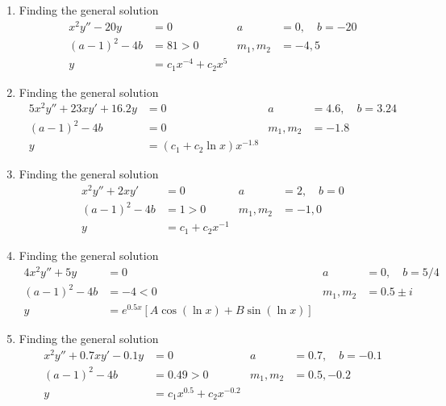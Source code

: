 \begin{enumerate}
    \item Finding the general solution
          \begin{align}
              x^{2}y'' -20y & = 0                        & a            & = 0, \quad b= -20 \\
              (a-1)^{2}-4b  & = 81 > 0                   & m_{1}, m_{2} & = -4, 5           \\
              y             & = c_{1}x^{-4} + c_{2}x^{5}
          \end{align}

    \item Finding the general solution
          \begin{align}
              5x^{2}y'' + 23xy' + 16.2y & = 0                             & a            & = 4.6, \quad b= 3.24 \\
              (a-1)^{2}-4b              & = 0                             & m_{1}, m_{2} & = -1.8               \\
              y                         & = (c_{1} + c_{2}\ln x )x^{-1.8}
          \end{align}

    \item Finding the general solution
          \begin{align}
              x^{2}y'' + 2xy' & = 0                   & a            & = 2, \quad b= 0 \\
              (a-1)^{2}-4b    & = 1 > 0               & m_{1}, m_{2} & = -1, 0         \\
              y               & = c_{1} + c_{2}x^{-1}
          \end{align}

    \item Finding the general solution
          \begin{align}
              4x^{2}y'' + 5y & = 0                                     & a            & = 0, \quad b= 5/4 \\
              (a-1)^{2}-4b   & = -4 < 0                                & m_{1}, m_{2} & = 0.5 \pm i       \\
              y              & = e^{0.5x}[A\cos(\ln x) + B\sin(\ln x)]
          \end{align}

    \item Finding the general solution
          \begin{align}
              x^{2}y'' + 0.7xy' - 0.1y & = 0                            & a            & = 0.7, \quad b= -0.1 \\
              (a-1)^{2}-4b             & = 0.49 > 0                     & m_{1}, m_{2} & =  0.5, -0.2         \\
              y                        & = c_{1}x^{0.5} + c_{2}x^{-0.2}
          \end{align}


\end{enumerate}
